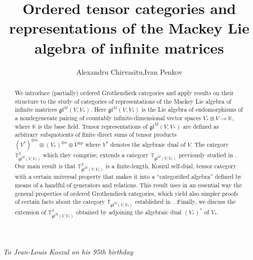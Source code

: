 \documentclass[11pt]{article}
\title{Ordered tensor categories and representations of the Mackey Lie algebra of infinite matrices}
\author{Alexandru Chirvasitu,\quad   Ivan Penkov}
\theoremstyle{plain}
\theoremstyle{nonumberplain}
\theoremstyle{plain}
\theoremstyle{nonumberplain}
\newcommand\bK{{\mathbb K}}
\newcommand\bT{{\mathbb T}}
\newcommand\fgl{\mathfrak{gl}}
\begin{document}
\date{}


\newcommand{\Addresses}{{%
  \bigskip
  \footnotesize

  \textsc{Department of Mathematics, University at Buffalo, Buffalo,
    NY 14260-2900, USA}\par\nopagebreak \textit{E-mail address}:
  \texttt{achirvas@buffalo.edu}

  \medskip

  \textsc{Jacobs University Bremen, Campus Ring 1, 28759 Bremen, Germany}\par\nopagebreak
  \textit{E-mail address}: \texttt{i.penkov@jacobs-university.de}
}}




\maketitle


\begin{center}
  {\it To Jean-Louis Koszul on his 95th birthday}
\end{center}


\begin{abstract}
We introduce (partially) ordered Grothendieck categories and apply results on their structure to the study of categories of representations of the Mackey Lie algebra of infinite matrices $\fgl^M\left(V,V_*\right)$.  Here $\fgl^M\left(V,V_*\right)$ is the Lie algebra of endomorphisms of a nondegenerate pairing of countably infinite-dimensional vector spaces $V_*\otimes V\to\bK$, where $\bK$ is the base field.  Tensor representations of $\fgl^M\left(V,V_*\right)$ are defined as arbitrary subquotients of finite direct sums of tensor products $(V^*)^{\otimes m}\otimes (V_*)^{\otimes n}\otimes V^{\otimes p}$ where $V^*$ denotes the algebraic dual of $V$. The category $\bT^3_{\fgl^M\left(V,V_*\right)}$ which they comprise, extends a category  $\bT_{\fgl^M\left(V,V_*\right)}$ previously studied in \cite{DPS,PS2,SS}. Our main result is that $\bT^3_{\fgl^M\left(V,V_*\right)}$ is a finite-length, Koszul self-dual, tensor category with a certain universal property that makes it into a ``categorified algebra'' defined by means of a handful of generators and relations. This result uses in an essential way the general properties of ordered Grothendieck categories, which yield also simpler proofs of certain facts about the category $\bT_{\fgl^M\left(V,V_*\right)}$ established in~\cite{PS2}.   Finally, we discuss the extension of $\bT^3_{\fgl^M\left(V,V_*\right)}$ obtained by adjoining the algebraic dual $(V_*)^*$ of $V_*$. 
\end{abstract}
\end{document}
